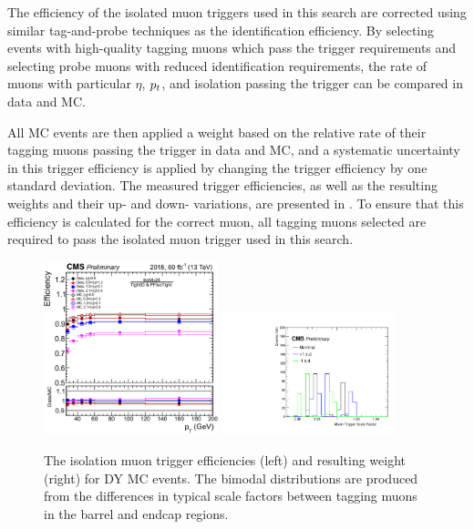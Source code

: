 The efficiency of the isolated muon triggers used in this search are corrected using similar tag-and-probe techniques as the identification efficiency. 
By selecting events with high-quality tagging muons which pass the trigger requirements and selecting probe muons with reduced identification requirements, the rate of muons with particular $\eta$, $p_t$, and isolation passing the trigger can be compared in data and MC.

All MC events are then applied a weight based on the relative rate of their tagging muons passing the trigger in data and MC, and a systematic uncertainty in this trigger efficiency is applied by changing the trigger efficiency by one standard deviation.
The measured trigger efficiencies, as well as the resulting weights and their up- and down- variations, are presented in .
To ensure that this efficiency is calculated for the correct muon, all tagging muons selected are required to pass the isolated muon trigger used in this search.

\begin{figure}[htbp]
	\centering
	\includegraphics[width=0.45\textwidth]{figures/muTrigEff_2018.pdf}
        \hspace{0.01\textwidth}
        \includegraphics[width=0.45\textwidth]{figures/trigSF.pdf}
	\caption[Muon Trigger Efficiencies and Weights]{The isolation muon trigger efficiencies (left) and resulting weight (right) for DY MC events. The bimodal distributions are produced from the differences in typical scale factors between tagging muons in the barrel and endcap regions.}
        \label{fig:muTrigSFs}
\end{figure}

